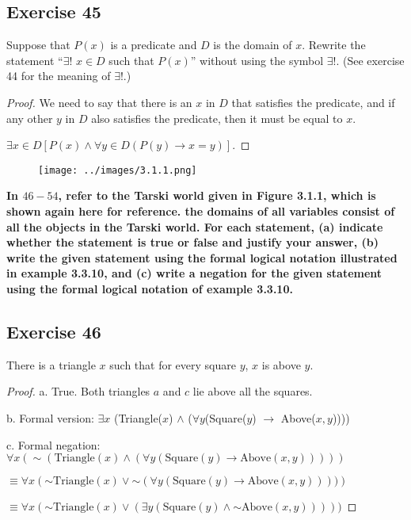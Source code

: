 \documentclass[14pt]{extarticle}
\newcommand{\fa}{\forall}
\newcommand{\te}{\exists}
\begin{document}
\subsection{Exercise 45}
Suppose that $P(x)$ is a predicate and $D$ is the domain of $x$. Rewrite the statement “$\te$! $x \in D$ such that $P(x)$” without using the symbol $\te$!. (See exercise 44 for the meaning of $\te$!.)

\begin{proof}
    We need to say that there is an $x$ in $D$ that satisfies the predicate, and if any other $y$ in $D$ also satisfies the predicate, then it must be equal to $x$.

    $\te x \in D [P(x) \wedge \fa y \in D (P(y) \to x = y)]$.
\end{proof}

\begin{figure}[ht!]
    \centering
    \texttt{[image: ../images/3.1.1.png]}
\end{figure}

{\bf \color{cyan} In $46-54$, refer to the Tarski world given in Figure 3.1.1, which is shown again here for reference. the domains of all variables consist of all the objects in the Tarski world. For each statement, (a) indicate whether the statement is true or false and justify your answer, (b) write the given statement using the formal logical notation illustrated in example 3.3.10, and (c) write a negation for the given statement using the formal logical notation of example 3.3.10.}

\subsection{Exercise 46}
There is a triangle $x$ such that for every square $y$, $x$ is above $y$.

\begin{proof}
    a. True. Both triangles $a$ and $c$ lie above all the
    squares.

    b. Formal version: $\te x$ (Triangle($x$) $\wedge$ ($\fa y$(Square($y$) $\to$ Above($x, y$))))

    c. Formal negation: $\fa x({\sim (\text{Triangle}(x) \wedge (\fa y(\text{Square}(y) \to \text{Above}(x, y))))})$

    $\equiv \fa x ({\sim \text{Triangle}(x)} \vee {\sim(\fa y(\text{Square}(y) \to \text{Above}(x, y))))})$

    $\equiv \fa x ({\sim \text{Triangle}(x)} \vee (\te y(\text{Square}(y) \wedge {\sim \text{Above}(x, y)}))))$
\end{proof}
\end{document}
